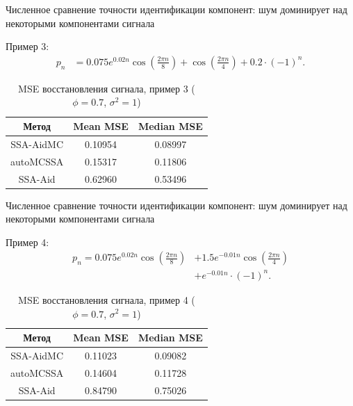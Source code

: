 \documentclass[pdf,notheorems,10pt,intlimits,unicode]{beamer}
\begin{document}
\begin{frame}{Численное сравнение точности идентификации компонент: шум доминирует над некоторыми компонентами сигнала}

    Пример 3:
    \begin{align*}
		p_n & =0.075 e^{0.02n}\cos\left(\frac{2 \pi n}{8}\right) + \cos\left(\frac{2 \pi n}{4}\right) + 0.2\cdot (-1)^n.
	\end{align*}

	\begin{table}
		\centering
        \caption{MSE восстановления сигнала, пример 3 ($\phi=0.7$, $\sigma^2=1$)}
		\begin{tabular}{c|c|c}
			Метод     & Mean MSE & Median MSE \\
			\hline
			SSA-AidMC & 0.10954  & 0.08997    \\
			\hline
			autoMCSSA & 0.15317  & 0.11806    \\
			\hline
			SSA-Aid   & 0.62960  & 0.53496    \\
			\hline
		\end{tabular}
	\end{table}
    
\end{frame}

\begin{frame}{Численное сравнение точности идентификации компонент: шум доминирует над некоторыми компонентами сигнала}

    Пример 4:
    \begin{align*}
		p_n =0.075 e^{0.02n}\cos\left(\frac{2 \pi n}{8}\right) &+ 1.5e^{-0.01n}\cos\left(\frac{2 \pi n}{4}\right)\\
        &+e^{-0.01n}\cdot (-1)^n.
	\end{align*}

	\begin{table}
		\centering
        \caption{MSE восстановления сигнала, пример 4 ($\phi=0.7$, $\sigma^2=1$)}
		\begin{tabular}{c|c|c}
			Метод     & Mean MSE & Median MSE \\
			\hline
			SSA-AidMC & 0.11023  & 0.09082    \\
			\hline
			autoMCSSA & 0.14604  & 0.11728    \\
			\hline
			SSA-Aid   & 0.84790  & 0.75026    \\
			\hline
		\end{tabular}
	\end{table}
    
\end{frame}
\end{document}
